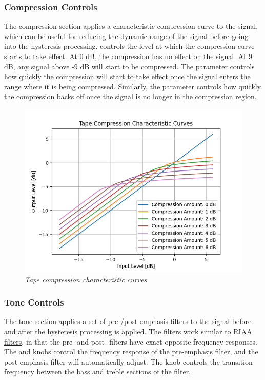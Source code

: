 \documentclass[landscape,twocolumn,a5paper]{manual}
\begin{document}
\subsubsection{Compression Controls}
The compression section applies a characteristic
compression curve to the signal, which can be useful
for reducing the dynamic range of the signal before
going into the hysteresis processing.
\newpar
{} controls the level at which the
compression curve starts to take effect. At 0 dB, the
compression has no effect on the signal. At 9 dB, any
signal above -9 dB will start to be compressed.
\newpar
The  parameter controls how quickly
the compression will start to take effect once the
signal enters the range where it is being compressed.
\newpar
Similarly, the  parameter controls
how quickly the compression backs off once the signal
is no longer in the compression region.
%
\begin{figure}[ht]
    \center
    \includegraphics[width=0.75\columnwidth]{../Simulations/Compression/compression_curves.png}
    \caption{\label{comp_curves}{\it Tape compression characteristic curves}}
\end{figure}

\subsubsection{Tone Controls}
The tone section applies a set of pre-/post-emphasis filters
to the signal before and after the hysteresis processing
is applied. The filters work similar to
\href{https://en.wikipedia.org/wiki/RIAA_equalization}{RIAA filters},
in that the pre- and post- filters have exact opposite frequency
responses.
\newpar
The  and  knobs control
the frequency response of the pre-emphasis filter, and the
post-emphasis filter will automatically adjust. The
 knob controls the transition frequency
between the bass and treble sections of the filter.
\end{document}

